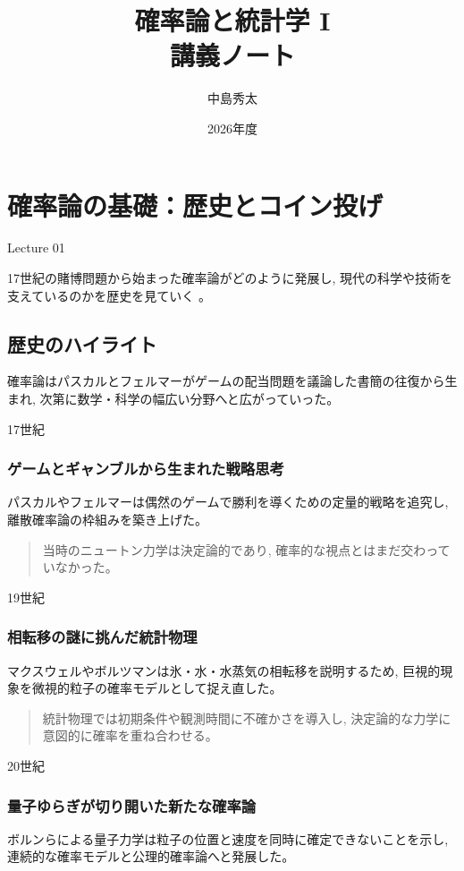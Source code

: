 \documentclass[uplatex,dvipdfmx,11pt,a4paper,openany]{bxjsbook}
\title{確率論と統計学 I\\講義ノート}
\author{中島秀太}
\date{2026年度}
\newenvironment{noteblock}{\begin{quote}\color{black!72}\small}{\end{quote}}
\begin{document}
\frontmatter
\maketitle
\tableofcontents
\mainmatter

\chapter{確率論の基礎：歴史とコイン投げ}
Lecture 01

17世紀の賭博問題から始まった確率論がどのように発展し, 現代の科学や技術を支えているのかを歴史を見ていく
                。

\section{歴史のハイライト}
確率論はパスカルとフェルマーがゲームの配当問題を議論した書簡の往復から生まれ, 次第に数学・科学の幅広い分野へと広がっていった。

17世紀

\subsection{ゲームとギャンブルから生まれた戦略思考}
パスカルやフェルマーは偶然のゲームで勝利を導くための定量的戦略を追究し, 離散確率論の枠組みを築き上げた。

\begin{noteblock}
当時のニュートン力学は決定論的であり, 確率的な視点とはまだ交わっていなかった。
\end{noteblock}

19世紀

\subsection{相転移の謎に挑んだ統計物理}
マクスウェルやボルツマンは氷・水・水蒸気の相転移を説明するため, 巨視的現象を微視的粒子の確率モデルとして捉え直した。

\begin{noteblock}
統計物理では初期条件や観測時間に不確かさを導入し, 決定論的な力学に意図的に確率を重ね合わせる。
\end{noteblock}

20世紀

\subsection{量子ゆらぎが切り開いた新たな確率論}
ボルンらによる量子力学は粒子の位置と速度を同時に確定できないことを示し, 連続的な確率モデルと公理的確率論へと発展した。
\end{document}
